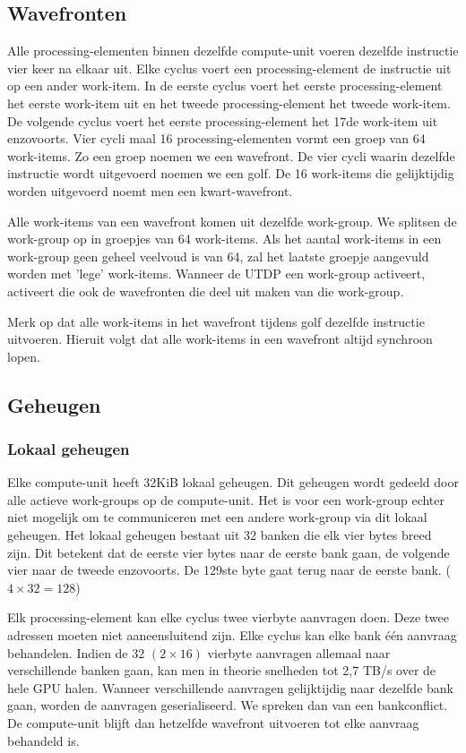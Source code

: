 \subsection{Wavefronten}
\label{wavefront}
Alle processing-elementen binnen dezelfde compute-unit voeren dezelfde instructie vier keer na elkaar uit. Elke cyclus voert een processing-element de instructie uit op een ander work-item. In de eerste cyclus voert het eerste processing-element het eerste work-item uit en het tweede processing-element het tweede work-item. De volgende cyclus voert het eerste processing-element het 17de work-item uit enzovoorts. Vier cycli maal 16 processing-elementen vormt een groep van 64 work-items. Zo een groep noemen we een wavefront. De vier cycli waarin dezelfde instructie wordt uitgevoerd noemen we een golf. De 16 work-items die gelijktijdig worden uitgevoerd noemt men een kwart-wavefront.

Alle work-items van een wavefront komen uit dezelfde work-group. We splitsen de work-group op in groepjes van 64 work-items. Als het aantal work-items in een work-group geen geheel veelvoud is van 64, zal het laatste groepje aangevuld worden met 'lege' work-items. Wanneer de UTDP een work-group activeert, activeert die ook de wavefronten die deel uit maken van die work-group.

Merk op dat alle work-items in het wavefront tijdens golf dezelfde instructie uitvoeren. Hieruit volgt dat alle work-items in een wavefront altijd synchroon lopen.



\subsection{Geheugen}

\subsubsection{Lokaal geheugen}
Elke compute-unit heeft 32KiB lokaal geheugen. Dit geheugen wordt gedeeld door alle actieve work-groups op de compute-unit. Het is voor een work-group echter niet mogelijk om te communiceren met een andere work-group via dit lokaal geheugen. Het lokaal geheugen bestaat uit 32 banken die elk vier bytes breed zijn. Dit betekent dat de eerste vier bytes naar de eerste bank gaan, de volgende vier naar de tweede enzovoorts. De 129ste byte gaat terug naar de eerste bank. ($4 \times 32 = 128$)

Elk processing-element kan elke cyclus twee vierbyte aanvragen doen. Deze twee adressen moeten niet aaneensluitend zijn. Elke cyclus kan elke bank \'e\'en aanvraag behandelen. Indien de 32 $(2 \times 16)$ vierbyte aanvragen allemaal naar verschillende banken gaan, kan men in theorie snelheden tot 2,7 TB/s over de hele GPU halen. Wanneer verschillende aanvragen gelijktijdig naar dezelfde bank gaan, worden de aanvragen geserialiseerd. We spreken dan van een bankconflict. De compute-unit blijft dan hetzelfde wavefront uitvoeren tot elke aanvraag behandeld is.

